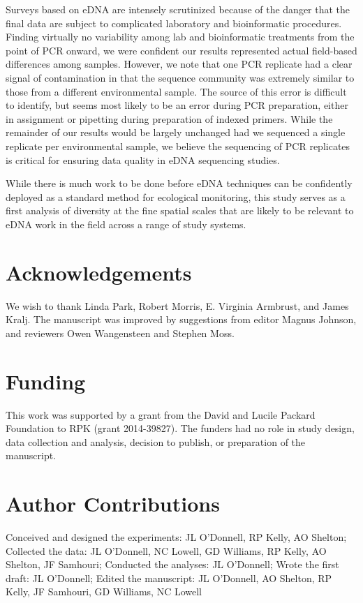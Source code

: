 \documentclass[11pt,letterpaper]{article} %
\begin{document}
Surveys based on eDNA are intensely scrutinized because of the danger that the final data are subject to complicated laboratory and bioinformatic procedures. Finding virtually no variability among lab and bioinformatic treatments from the point of PCR onward, we were confident our results represented actual field-based differences among samples. However, we note that one PCR replicate had a clear signal of contamination in that the sequence community was extremely similar to those from a different environmental sample. The source of this error is difficult to identify, but seems most likely to be an error during PCR preparation, either in assignment or pipetting during preparation of indexed primers. While the remainder of our results would be largely unchanged had we sequenced a single replicate per environmental sample, we believe the sequencing of PCR replicates is critical for ensuring data quality in eDNA sequencing studies.


While there is much work to be done before eDNA techniques can be confidently deployed as a standard method for ecological monitoring, this study serves as a first analysis of diversity at the fine spatial scales that are likely to be relevant to eDNA work in the field across a range of study systems.

\section*{Acknowledgements}
We wish to thank Linda Park, Robert Morris, E. Virginia Armbrust, and James Kralj.
The manuscript was improved by suggestions from editor Magnus Johnson, and reviewers Owen Wangensteen and Stephen Moss.

\section*{Funding}
This work was supported by a grant from the David and Lucile Packard Foundation to RPK (grant 2014-39827). The funders had no role in study design, data collection and analysis, decision to publish, or preparation of the manuscript.

\section*{Author Contributions}
Conceived and designed the experiments:
JL O'Donnell, RP Kelly, AO Shelton;
Collected the data:
JL O'Donnell, NC Lowell, GD Williams, RP Kelly, AO Shelton, JF Samhouri;
Conducted the analyses:
JL O'Donnell;
Wrote the first draft:
JL O'Donnell;
Edited the manuscript:
JL O'Donnell, AO Shelton, RP Kelly, JF Samhouri, GD Williams, NC Lowell
\end{document}
